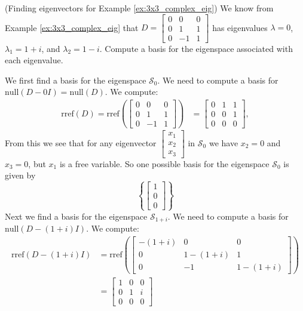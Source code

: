\documentclass{ximera}
\begin{document}
\begin{example}\label{ex:3x3_complex_ev} (Finding eigenvectors for Example \ref{ex:3x3_complex_eig})
We know from Example \ref{ex:3x3_complex_eig} that $D=\begin{bmatrix} 0&0&0\\ 0 &1&1\\ 0 & -1&1\end{bmatrix}$ has eigenvalues $\lambda=0$, $\lambda_1=1+i$, and $\lambda_2=1-i$.  Compute a basis for the eigenspace associated with each eigenvalue.
\begin{explanation}
We first find a basis for the eigenspace $\mathcal{S}_0$.  We need to compute a basis for $\mbox{null}(D-0I)=\mbox{null}(D)$.  We compute:
\begin{align*}\mbox{rref}(D)=\mbox{rref}\left(\begin{bmatrix} 0&0&0\\ 0 &1&1\\ 0 & -1&1\end{bmatrix}\right)&=\begin{bmatrix} 0 & 1 & 1\\ 0 & 0 & 1\\ 0 & 0 & 0\end{bmatrix},
\end{align*}
From this we see that for any eigenvector $\begin{bmatrix}x_1\\x_2\\x_3\end{bmatrix}$ in $\mathcal{S}_0$ we have $x_2=0$ and $x_3=0$, but $x_1$ is a free variable.
So one possible basis for the eigenspace $\mathcal{S}_0$ is given by $$\left\{\begin{bmatrix}1\\0\\0\end{bmatrix}\right\}$$
Next we find a basis for the eigenspace $\mathcal{S}_{1+i}$.  We need to compute a basis for $\mbox{null}(D-(1+i)I)$.  We compute:
\begin{align*}\mbox{rref}(D-(1+i)I)&=\mbox{rref}\left(\begin{bmatrix} -(1+i)&0&0\\ 0 &1-(1+i)&1\\ 0 & -1&1-(1+i)\end{bmatrix}\right) \\
&=\begin{bmatrix} 1 & 0 &0\\ 0 & 1 & i\\ 0 & 0 & 0\end{bmatrix}

\end{align*}
\end{explanation}
\end{example}
\end{document}
